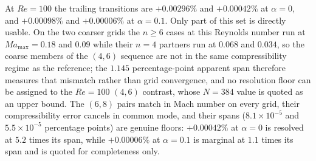 At $Re=100$ the trailing transitions are $+0.00296\%$ and $+0.00042\%$ at $\alpha=0$, and $+0.00098\%$ and $+0.00006\%$ at $\alpha=0.1$. Only part of this set is directly usable. On the two coarser grids the $n\ge 6$ cases at this Reynolds number run at $Ma_{\max}=0.18$ and $0.09$ while their $n=4$ partners run at $0.068$ and $0.034$, so the coarse members of the $(4,6)$ sequence are not in the same compressibility regime as the reference; the $1.145$ percentage-point apparent span therefore measures that mismatch rather than grid convergence, and no resolution floor can be assigned to the $Re=100$ $(4,6)$ contrast, whose $N=384$ value is quoted as an upper bound. The $(6,8)$ pairs match in Mach number on every grid, their compressibility error cancels in common mode, and their spans ($8.1\times 10^{-5}$ and $5.5\times 10^{-5}$ percentage points) are genuine floors: $+0.00042\%$ at $\alpha=0$ is resolved at $5.2$ times its span, while $+0.00006\%$ at $\alpha=0.1$ is marginal at $1.1$ times its span and is quoted for completeness only.



